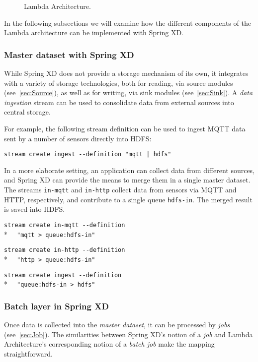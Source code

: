 \begin{figure}[ht]
\centering
{}
\caption{Lambda Architecture.}
\label{fig:lambda}
\end{figure}

In the following subsections we will examine how the different components
of the Lambda architecture can be implemented with Spring XD.

\subsubsection {Master dataset with Spring XD}

While Spring XD does not provide a storage mechanism of its own, it
integrates with a variety of storage technologies, both for reading,
via source modules (see~\ref{sec:Source}), as well as for writing, via
sink modules (see~\ref{sec:Sink}). A \emph{data ingestion}
stream can be used to consolidate data from external sources into
central storage.

For example, the following stream definition can be used to ingest 
MQTT\cite{mqtt} data sent by a number of sensors directly into HDFS:

\verb;stream create ingest --definition "mqtt | hdfs";

In a more elaborate setting, an application can collect data from
different sources, and Spring XD can provide the means to merge them
in a single master dataset. The streams \texttt{in-mqtt} and \texttt{in-http}
collect data from sensors via MQTT and HTTP, respectively, and
contribute to a single queue \texttt{hdfs-in}. The merged result
is saved into HDFS.

\verb;stream create in-mqtt --definition ;\\*
\verb;  "mqtt > queue:hdfs-in";

\verb;stream create in-http --definition  ;\\*
\verb;  "http > queue:hdfs-in";

\verb;stream create ingest --definition  ;\\*
\verb;  "queue:hdfs-in > hdfs";

\subsubsection {Batch layer in Spring XD}

Once data is collected into the \emph{master dataset}, it can be processed
by \emph{jobs} (see~\ref{sec:Job}). The similarities between Spring XD's
notion of a \emph{job} and Lambda Architecture's corresponding notion of
a \emph{batch job} make the mapping straightforward.


